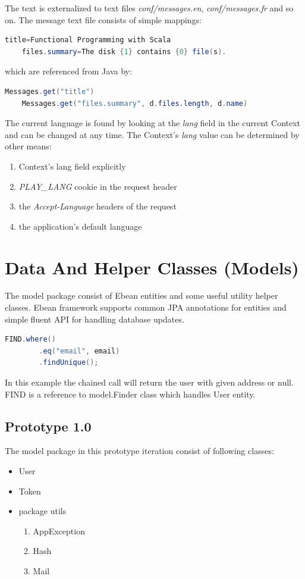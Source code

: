\documentclass[12pt,twoside,a4paper]{report}
\begin{document}
The text is externalized to text files \emph{conf/messages.en}, \emph{conf/messages.fr} and so on. The message text file consists of simple mappings:
\begin{lstlisting}[language=java]
	title=Functional Programming with Scala
	files.summary=The disk {1} contains {0} file(s).
\end{lstlisting}
which are referenced from Java by:
\begin{lstlisting}[language=java]
	Messages.get("title")
	Messages.get("files.summary", d.files.length, d.name)
\end{lstlisting}

The current language is found by looking at the \emph{lang} field in the current Context and can be changed at any time. The Context’s \emph{lang} value can be determined by other means:
\begin{enumerate}\itemsep1pt \parskip0pt 
\item Context’s lang field explicitly
\item \emph{PLAY\_LANG} cookie in the request header
\item the \emph{Accept-Language} headers of the request
\item the application’s default language
\end{enumerate}

\section{Data And Helper Classes (Models)}\label{4.4}
The model package consist of Ebean entities and some useful utility helper classes. Ebean framework supports common JPA annotations for entities and simple fluent API for handling database updates.

\begin{lstlisting}[language=java]
	FIND.where()
		.eq("email", email)
		.findUnique();
\end{lstlisting}

In this example the chained call will return the user with given address or null. FIND is a reference to model.Finder class which handles User entity.

\subsection{Prototype 1.0}\label{4.4.1}
The model package in this prototype iteration consist of following classes:
\begin{itemize}\itemsep1pt \parskip0pt 
	\item User
	\item Token
	\item package utils
	\begin{enumerate}\itemsep1pt \parskip0pt 
	\item AppException
	\item Hash
	\item Mail
	\end{enumerate}
\end{itemize}
\end{document}
